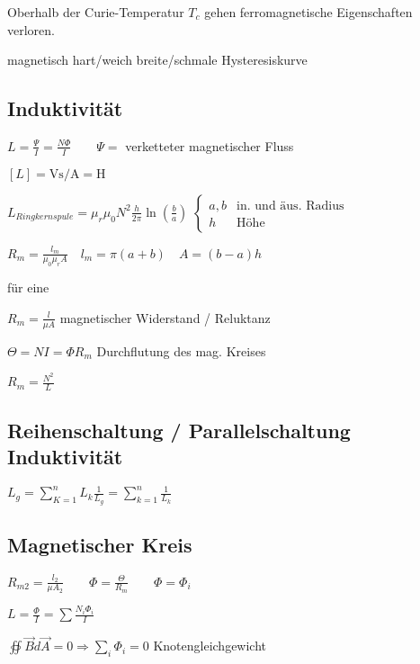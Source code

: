 \documentclass[10pt,a4paper]{scrartcl}
\begin{document}
\begin{multicols*}{3}
	Oberhalb der Curie-Temperatur $T_c$ gehen ferromagnetische Eigenschaften verloren.
	
	magnetisch hart/weich \dahe breite/schmale Hysteresiskurve
	\vfill
	\null
	\columnbreak
	
	\subsection{Induktivität}
	
	$L=\frac{\Psi}{I}=\frac{N\Phi}{I}\qquad\Psi = $ verketteter magnetischer Fluss
	
	$[L]=\si{\volt\second\per\ampere}=\si{\henry}$

	$L_{Ringkernspule}=\mu_r\mu_0N^2\frac{h}{2\pi}\ln(\frac{b}{a})$
	\scriptsize $\begin{cases}a,b&\text{in. und äus. Radius}\\h&\text{Höhe}\end{cases}$\normalsize

	$R_m=\frac{l_m}{\mu_0\mu_rA}\quad l_m=\pi(a+b)\quad A=(b-a)h$
	
	\finn
	
	für eine 
	
	$R_m=\frac{l}{\mu A}$ \hfill magnetischer Widerstand / Reluktanz
	
	$\Theta = NI = \Phi R_m$ \hfill Durchflutung des mag. Kreises
	
	$R_m=\frac{N^2}{L}$
	
	\subsection{Reihenschaltung / Parallelschaltung Induktivität}
	
	$L_g=\sum_{K=1}^n{L_k}$\hfill$\frac{1}{L_g}=\sum_{k=1}^n{\frac{1}{L_k}}$
	
	\subsection{Magnetischer Kreis}
	
	
	$R_{m2}=\frac{l_2}{\mu A_2}\qquad \Phi = \frac{\Theta}{R_m} \qquad \Phi = \Phi_i$	
	
	$L=\frac{\Phi}{I}=\sum\frac{N_i\Phi_i}{I}$
	
	
	$\oiint{\vec{B}d\vec{A}}=0\Rightarrow\sum_{i}{\Phi_i} = 0$ \hfill Knotengleichgewicht
		

\end{multicols*}
\end{document}
